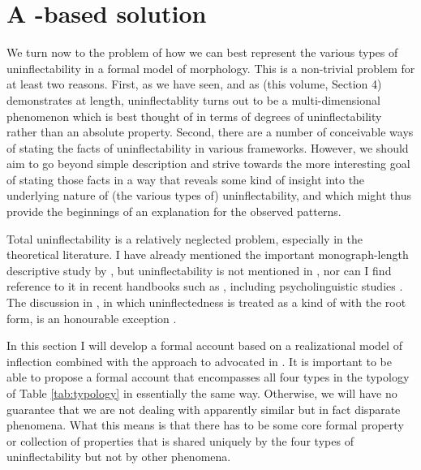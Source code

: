 \documentclass[output=paper,colorlinks,citecolor=brown]{langscibook}
\begin{document}
\section{A -based solution}  \label{sec:solution}

We turn now to the problem of how we can best represent the various types of uninflectability in a formal model of morphology. This is a non-trivial problem for at least two reasons. First, as we have seen, and as \citeauthor{corbett2025} (this volume, Section 4) demonstrates at length, uninflectablity turns out to be a multi-dimensional phenomenon which is best thought of in terms of degrees of uninflectability rather than an absolute property.  Second,  there are a number of conceivable ways of stating the facts of uninflectability in various frameworks. However, we should aim to go beyond simple description and strive towards the more interesting goal of stating those facts in a way that reveals some kind of insight into the underlying nature of (the various types of) uninflectability, and which might thus provide the beginnings of an explanation for the observed patterns. 

Total uninflectability is a relatively neglected problem,  especially in the theoretical literature. I have already mentioned the important monograph-length descriptive study by \citet{doleschal2001}, but uninflectability  is not mentioned in \citet{stump2016}, nor can I find reference to it in recent handbooks such as \citet{baerman2015}, including psycholinguistic studies \citep{stoll2015, walenski2015}. The discussion in \citet[65, 156, 162]{brownhippisley2012}, in which uninflectedness is treated as a kind of  with the root form, is an honourable exception \citep[see also][26.]{baermanbrowncorbett2017}.

In this section I will develop a formal account based on a realizational model of inflection combined with the approach to  advocated in \citet{spencer2013}. It is important to be able to propose a formal account that encompasses all four types in the typology of Table \ref{tab:typology} in essentially the same way. Otherwise, we will have no guarantee that we are not dealing with apparently similar but in fact disparate phenomena.  What this means is that there has to be some core formal property or collection of properties that is shared uniquely by the four types of uninflectability but not by other phenomena. 
\end{document}
